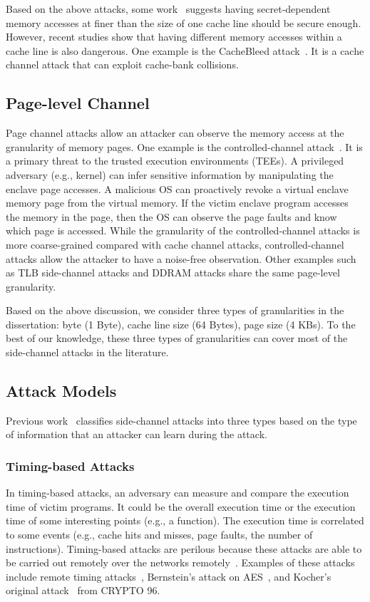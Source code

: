 Based on the above attacks, some work~\cite{brickell2011technologies} suggests having secret-dependent memory accesses at finer than the size of one cache line should be secure enough. However, recent studies show that having different memory accesses within a cache line is also dangerous. One example is the CacheBleed attack~\cite{yarom2017cachebleed}. It is a cache channel attack that can exploit cache-bank collisions. 
\subsection{Page-level Channel}
Page channel attacks allow an attacker can observe the memory access at the granularity of memory pages. One example is the controlled-channel attack~\cite{xu2015controlled}. It is a primary threat to the trusted execution environments (TEEs).  A privileged adversary (e.g., kernel) can infer sensitive information by manipulating the enclave page accesses. A malicious OS can proactively revoke a virtual enclave memory page from the virtual memory. If the victim enclave program accesses the memory in the  page, then the OS can observe the page faults and know which page is accessed. While the granularity of the controlled-channel attacks is more coarse-grained compared with cache channel attacks, controlled-channel attacks allow the attacker to have a noise-free observation. Other examples such as TLB side-channel attacks and DDRAM attacks share the same page-level granularity.


Based on the above discussion, we consider three types of granularities in the dissertation: byte (1 Byte), cache line size (64 Bytes), page size (4 KBs). To the best of our knowledge, these three types of granularities can cover most of the side-channel attacks in the literature.


\subsection{Attack Models}
Previous work~\cite{182946} classifies side-channel attacks into three types based on the type of information that an attacker can learn during the attack.
\subsubsection*{Timing-based Attacks}
In timing-based attacks, an adversary can measure and compare the execution time of victim programs. It could be the overall execution time or the execution time of some interesting points (e.g., a function).  The execution time is correlated to some events (e.g., cache hits and misses, page faults, the number of instructions). Timing-based attacks are perilous because these attacks are able to be carried out remotely over the networks remotely~\cite{brumley2005remote}. Examples of these attacks include remote timing attacks~\cite{brumley2005remote}, Bernstein's attack on AES~\cite{bernstein2005cache}, and Kocher’s original attack~\cite{kocher1996timing} from CRYPTO 96.
